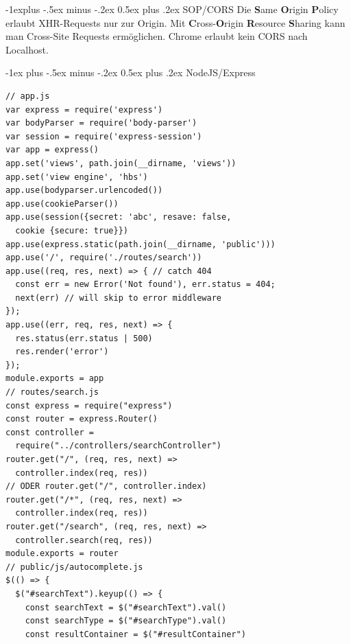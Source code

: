 \documentclass[a4paper, fontsize=6pt]{scrartcl}
\makeatletter
\renewcommand{\section}{\@startsection{section}{1}{0mm}%
    {-1ex plus -.5ex minus -.2ex}%
    {0.5ex plus .2ex}%
    {\normalfont\large\bfseries}}
\renewcommand{\subsection}{\@startsection{subsection}{2}{0mm}%
    {-1explus -.5ex minus -.2ex}%
    {0.5ex plus .2ex}%
    {\normalfont\normalsize\bfseries}}
\makeatother
\begin{document}
\begin{multicols*}{5}
\subsection{SOP/CORS}
Die \textbf{S}ame \textbf{O}rigin \textbf{P}olicy erlaubt XHR-Requests nur zur Origin. Mit \textbf{C}ross-\textbf{O}rigin \textbf{R}esource \textbf{S}haring kann man Cross-Site Requests ermöglichen. Chrome erlaubt kein CORS nach Localhost.


\section{NodeJS/Express}
\begin{verbatim}
// app.js
var express = require('express')
var bodyParser = require('body-parser')
var session = require('express-session')
var app = express()
app.set('views', path.join(__dirname, 'views'))
app.set('view engine', 'hbs')
app.use(bodyparser.urlencoded())
app.use(cookieParser())
app.use(session({secret: 'abc', resave: false,
  cookie {secure: true}})
app.use(express.static(path.join(__dirname, 'public')))
app.use('/', require('./routes/search'))
app.use((req, res, next) => { // catch 404
  const err = new Error('Not found'), err.status = 404;
  next(err) // will skip to error middleware
});
app.use((err, req, res, next) => {
  res.status(err.status | 500)
  res.render('error')
});
module.exports = app
// routes/search.js
const express = require("express")
const router = express.Router()
const controller = 
  require("../controllers/searchController")
router.get("/", (req, res, next) =>
  controller.index(req, res))
// ODER router.get("/", controller.index)
router.get("/*", (req, res, next) =>
  controller.index(req, res))
router.get("/search", (req, res, next) =>
  controller.search(req, res))
module.exports = router
// public/js/autocomplete.js
$(() => {
  $("#searchText").keyup(() => {
    const searchText = $("#searchText").val()
    const searchType = $("#searchType").val()
    const resultContainer = $("#resultContainer")


\end{verbatim}
\end{multicols*}
\end{document}
